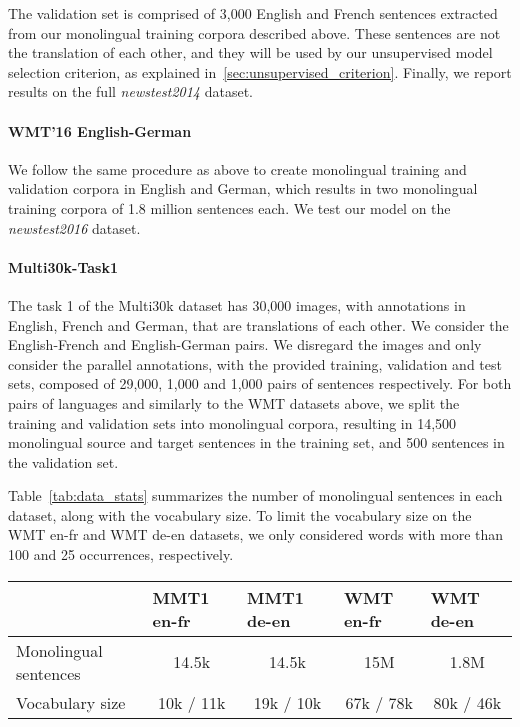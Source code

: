 \documentclass{article} \usepackage{iclr2018_conference,times}
\begin{document}
The validation set is comprised of 3,000 English and French sentences extracted from our  monolingual training corpora described above. These sentences are not the translation of each other, and they will be used by our unsupervised model selection criterion, as explained in~\ref{sec:unsupervised_criterion}. Finally, we report results on the full \textit{newstest2014} dataset.

\paragraph{WMT'16 English-German} We follow the same procedure as above to create monolingual training and validation corpora in English and German, which results in two monolingual training corpora of 1.8 million sentences each. We test our model on the \textit{newstest2016} dataset.

\paragraph{Multi30k-Task1} The task 1 of the Multi30k dataset \citep{elliott2016multi30k} has 30,000 images, with annotations in English, French and German, that are translations of each other. We consider the English-French and English-German pairs. We disregard the images and only consider the parallel annotations, with the provided training, validation and test sets, composed of 29,000, 1,000 and 1,000 pairs of sentences respectively. For both pairs of languages and similarly to the WMT datasets above, we split the training and validation sets into monolingual corpora, resulting in 14,500 monolingual source and target sentences in the training set, and 500 sentences in the validation set.

Table~\ref{tab:data_stats} summarizes the number of monolingual sentences in each dataset, along with the vocabulary size. To limit the vocabulary size on the WMT en-fr and WMT de-en datasets, we only considered words with more than 100 and 25 occurrences, respectively.


\begin{table*}[t]
    \begin{center}
    \centering
    \begin{tabular}{lllll}
    \toprule
    & MMT1 en-fr & MMT1 de-en & WMT en-fr & WMT de-en \\
    \midrule
    Monolingual sentences & \multicolumn{1}{c}{14.5k} & \multicolumn{1}{c}{14.5k} & \multicolumn{1}{c}{15M} & \multicolumn{1}{c}{1.8M} \\
    Vocabulary size & \multicolumn{1}{c}{10k / 11k} & \multicolumn{1}{c}{19k / 10k} &  \multicolumn{1}{c}{67k / 78k} &  \multicolumn{1}{c}{80k / 46k} \\
    \bottomrule
    \end{tabular}
	\caption{\textbf{Multi30k-Task1 and WMT datasets statistics.}
	To limit the vocabulary size in the WMT en-fr and WMT de-en datasets, we only considered words with more than 100 and 25 occurrences, respectively.}
	\label{tab:data_stats}
    \end{center}
\end{table*}
\end{document}
